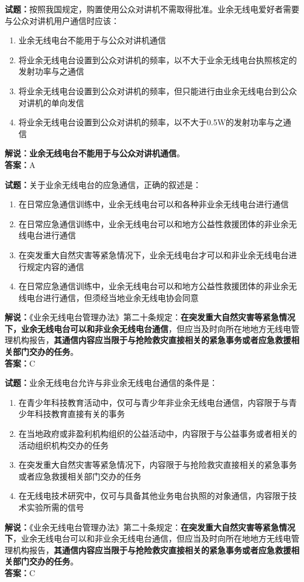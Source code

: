 \documentclass{ctexbook}
\begin{document}
\bigskip


\noindent\textbf{试题：}按照我国规定，购置使用公众对讲机不需取得批准。业余无线电爱好者需要与公众对讲机用户通信时应该：
\begin{enumerate}[leftmargin=3em]
	\item 业余无线电台不能用于与公众对讲机通信
	\item 将业余无线电台设置到公众对讲机的频率，以不大于业余无线电台执照核定的发射功率与之通信
	\item 将业余无线电台设置到公众对讲机的频率，但只能进行由业余无线电台到公众对讲机的单向发信
	\item 将业余无线电台设置到公众对讲机的频率，以不大于0.5W的发射功率与之通信
\end{enumerate}
\noindent\textbf{解说：}\textbf{业余无线电台不能用于与公众对讲机通信}。\\\noindent\textbf{答案：}A


\bigskip


\noindent\textbf{试题：}关于业余无线电台的应急通信，正确的叙述是：
\begin{enumerate}[leftmargin=3em]
	\item 在日常应急通信训练中，业余无线电台可以和各种非业余无线电台进行通信
	\item 在日常应急通信训练中，业余无线电台可以和地方公益性救援团体的非业余无线电台进行通信
	\item 在突发重大自然灾害等紧急情况下，业余无线电台才可以和非业余无线电台进行规定内容的通信
	\item 在日常应急通信训练中，业余无线电台可以和地方公益性救援团体的非业余无线电台进行通信，但须经当地业余无线电协会同意
\end{enumerate}
\noindent\textbf{解说：}《业余无线电台管理办法》第二十条规定：\textbf{在突发重大自然灾害等紧急情况下，业余无线电台可以和非业余无线电台通信}，但应当及时向所在地地方无线电管理机构报告，\textbf{其通信内容应当限于与抢险救灾直接相关的紧急事务或者应急救援相关部门交办的任务}。\\\noindent\textbf{答案：}C



\bigskip


\noindent\textbf{试题：}业余无线电台允许与非业余无线电台通信的条件是：
\begin{enumerate}[leftmargin=3em]
	\item 在青少年科技教育活动中，仅可与青少年非业余无线电台通信，内容限于与青少年科技教育直接有关的事务
	\item 在当地政府或非盈利机构组织的公益活动中，内容限于与公益事务或者相关的活动组织机构交办的任务
	\item 在突发重大自然灾害等紧急情况下，内容限于与抢险救灾直接相关的紧急事务或者应急救援相关部门交办的任务
	\item 在无线电技术研究中，仅可与具备其他业务电台执照的对象通信，内容限于技术实验所需的信号
\end{enumerate}
\noindent\textbf{解说：}《业余无线电台管理办法》第二十条规定：\textbf{在突发重大自然灾害等紧急情况下}，业余无线电台可以和非业余无线电台通信，但应当及时向所在地地方无线电管理机构报告，\textbf{其通信内容应当限于与抢险救灾直接相关的紧急事务或者应急救援相关部门交办的任务}。\\\noindent\textbf{答案：}C
\end{document}
